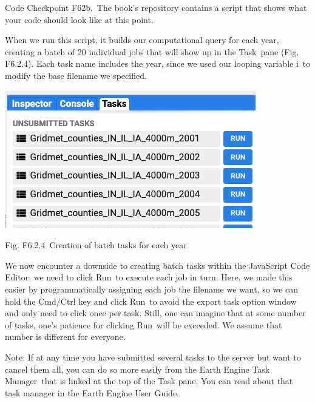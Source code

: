 \documentclass[
  letterpaper,
  DIV=11,
  numbers=noendperiod]{scrreprt}
\begin{document}
\begin{tcolorbox}[enhanced jigsaw, left=2mm, breakable, rightrule=.15mm, opacityback=0, colframe=quarto-callout-note-color-frame, colbacktitle=quarto-callout-note-color!10!white, arc=.35mm, opacitybacktitle=0.6, toptitle=1mm, colback=white, leftrule=.75mm, title=\textcolor{quarto-callout-note-color}{\faInfo}\hspace{0.5em}{Note}, toprule=.15mm, bottomtitle=1mm, titlerule=0mm, bottomrule=.15mm, coltitle=black]

Code Checkpoint F62b.~The book's repository contains a script that shows
what your code should look like at this point.

\end{tcolorbox}

When we run this script, it builds our computational query for each
year, creating a batch of 20 individual jobs that will show up in the
Task~pane (Fig. F6.2.4). Each task name includes the year, since we used
our looping variable i~to modify the base filename we specified.

\includegraphics{./F6/image63.png}

Fig. F6.2.4~Creation of batch tasks for each year

We now encounter a downside to creating batch tasks within the
JavaScript Code Editor: we need to click Run~to execute each job in
turn. Here, we made this easier by programmatically assigning each job
the filename we want, so we can hold the Cmd/Ctrl key and click Run~to
avoid the export task option window and only need to click once per
task. Still, one can imagine that at some number of tasks, one's
patience for clicking Run~will be exceeded. We assume that number is
different for everyone.

Note: If at any time you have submitted several tasks to the server but
want to cancel them all, you can do so more easily from the Earth Engine
Task Manager~that is linked at the top of the Task pane. You can read
about that task manager in the Earth Engine User Guide.
\end{document}
